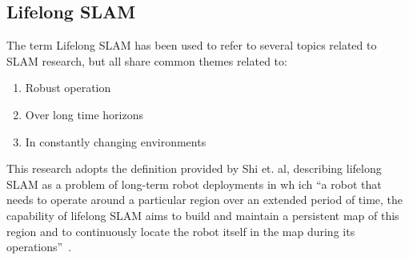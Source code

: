 \subsection{Lifelong SLAM}

The term Lifelong SLAM has been used to refer to several topics related to SLAM research, but all share common themes related to:
\begin{singlespace}
    \begin{enumerate}
        \item Robust operation
        \item Over long time horizons
        \item In constantly changing environments
    \end{enumerate}
\end{singlespace}
This research adopts the definition provided by Shi et. al, describing lifelong SLAM as a problem of long-term robot deployments in wh
ich ``a robot that needs to operate around a particular region over an extended period of time, the capability of lifelong SLAM aims to build and maintain a persistent map of this region and to continuously locate the robot itself in the map during its operations''~\cite{shi2020openloris}.